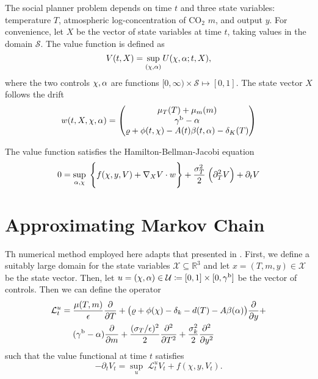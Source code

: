 \documentclass[../../main.tex]{subfiles}
\begin{document}
The social planner problem depends on time $t$ and three state variables: temperature $T$, atmospheric log-concentration of CO$_2$ $m$, and output $y$. For convenience, let $X$ be the vector of state variables at time $t$, taking values in the domain $\mathcal{S}$. The value function is defined as \begin{equation}
    V(t, X) = \sup_{(\chi, \alpha)} U(\chi, \alpha; t, X),
\end{equation} where the two controls $\chi, \alpha$ are functions $[0, \infty) \times \mathcal{S} \mapsto [0, 1]$. The state vector $X$ follows the drift \begin{equation}
    w(t, X,  \chi, \alpha) = \begin{pmatrix}
        \mu_T(T) + \mu_m(m) \\
        \gamma^{\mathrm{b}} - \alpha \\
        \varrho + \phi(t, \chi) - A(t) \beta(t, \alpha) - \delta_K(T)
    \end{pmatrix}
\end{equation}

\begin{proposition}
    The value function satisfies the Hamilton-Bellman-Jacobi equation \begin{equation}
        0 = \sup_{\alpha, \chi} \; \Bigg\{ f(\chi, y, V ) + \nabla_X V \cdot w  \Bigg\} + \frac{\sigma_T^2}{2} \; \Big(\partial^2_T V \Big) + \partial_t V
    \end{equation}
\end{proposition}
\fi

\section{Approximating Markov Chain} \label{appendix:approximating-markov-chain}

Th numerical method employed here adapts that presented in \citep{kushner_numerical_2001}. First, we define a suitably large domain for the state variables $\mathcal{X} \subseteq \mathbb{R}^3$ and let $x = (T, m, y) \in \mathcal{X}$ be the state vector. Then, let $u = (\chi, \alpha) \in \mathcal{U} \coloneqq [0, 1] \times [0, \gamma^{\mathrm{b}}]$ be the vector of controls. Then we can define the operator \begin{equation}
    \begin{split}
        \mathcal{L}_t^u = \; &\frac{\mu(T, m)}{\epsilon} \frac{\partial}{\partial T} + \big(\varrho + \phi(\chi) - \delta_k - d(T) - A \beta(\alpha) \big) \frac{\partial}{\partial y} + \\ 
        &(\gamma^{\mathrm{b}} - \alpha)\frac{\partial}{\partial m} + \frac{(\sigma_T / \epsilon)^2}{2} \frac{\partial^2}{\partial T^2} + \frac{\sigma^2_k}{2} \frac{\partial^2}{\partial y^2} 
    \end{split}
\end{equation} such that the value functional at time $t$ satisfies \begin{equation} \label{eq:operator-definition}
    -\partial_t V_t =  \sup_{u} \; \mathcal{L}_t^u V_t + f(\chi, y, V_t).
\end{equation}
\end{document}
